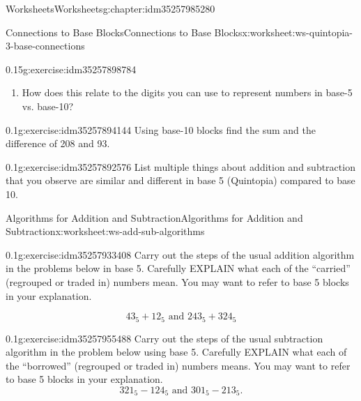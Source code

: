 \documentclass[twoside,11pt,]{book}
\begin{document}
\begin{chapterptx}{Worksheets}{}{Worksheets}{}{}{g:chapter:idm35257985280}
\begin{worksheet-section-numberless}{Connections to Base Blocks}{}{Connections to Base Blocks}{}{}{x:worksheet:ws-quintopia-3-base-connections}
\begin{divisionexercise}{3}{}{0.15}{g:exercise:idm35257898784}
\begin{enumerate}[label=(\alph*)]
\item{}How does this relate to the digits you can use to represent numbers in base-5 vs. base-10?%
\end{enumerate}
\end{divisionexercise}%
\begin{divisionexercise}{4}{}{0.1}{g:exercise:idm35257894144}%
Using base-10 blocks find the sum and the difference of 208 and 93.%
\end{divisionexercise}%
\begin{divisionexercise}{5}{}{0.1}{g:exercise:idm35257892576}%
List multiple things about addition and subtraction that you observe are similar and different in base 5 (Quintopia) compared to base 10.%
\end{divisionexercise}%
\end{worksheet-section-numberless}
\restoregeometry
%
%
\typeout{************************************************}
\typeout{************************************************}
%
\begin{worksheet-section-numberless}{Algorithms for Addition and Subtraction}{}{Algorithms for Addition and Subtraction}{}{}{x:worksheet:ws-add-sub-algorithms}
\begin{divisionexercise}{1}{}{0.1}{g:exercise:idm35257933408}%
Carry out the steps of the usual addition algorithm in the problems below in base 5.  Carefully EXPLAIN what each of the ``carried'' (regrouped or traded in) numbers mean.  You may want to refer to base 5 blocks in your explanation.%
\par
%
\begin{equation*}
43_{5}+12_{5} \text{ and } 243_{5}+324_{5}
\end{equation*}
%
\end{divisionexercise}%
\clearpage
\begin{divisionexercise}{2}{}{0.1}{g:exercise:idm35257955488}%
Carry out the steps of the usual subtraction algorithm in the problem below using base 5.  Carefully EXPLAIN what each of the ``borrowed'' (regrouped or traded in) numbers means.  You may want to refer to base 5 blocks in your explanation.%
\begin{equation*}
321_{5}-124_5 \text{ and } 301_5-213_5 \text{.}
\end{equation*}
%
\end{divisionexercise}%
\end{worksheet-section-numberless}

\end{chapterptx}
\end{document}

